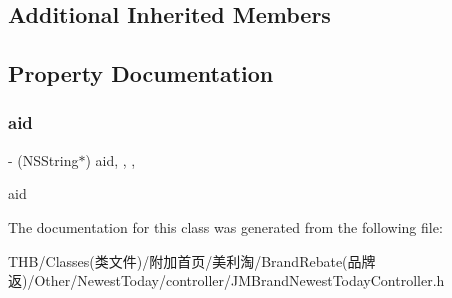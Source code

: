 \subsection*{Additional Inherited Members}


\subsection{Property Documentation}
\mbox{\label{interface_j_m_brand_newest_today_controller_a017b3c9bffad7c090888301c693bad33}} 
\subsubsection{\texorpdfstring{aid}{aid}}
{\footnotesize\ttfamily -\/ (N\+S\+String$\ast$) aid\hspace{0.3cm}{\ttfamily [read]}, {\ttfamily [write]}, {\ttfamily [nonatomic]}, {\ttfamily [copy]}}

aid 

The documentation for this class was generated from the following file\+:\begin{DoxyCompactItemize}
\item 
T\+H\+B/\+Classes(类文件)/附加首页/美利淘/\+Brand\+Rebate(品牌返)/\+Other/\+Newest\+Today/controller/J\+M\+Brand\+Newest\+Today\+Controller.\+h\end{DoxyCompactItemize}
